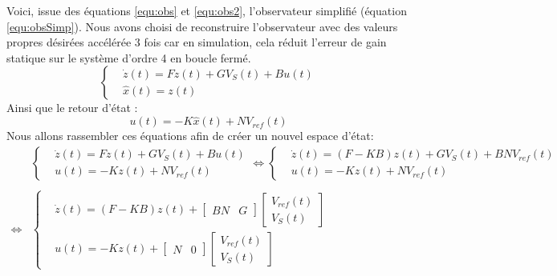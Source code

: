 Voici, issue des équations \ref{equ:obs} et \ref{equ:obs2}, l'observateur simplifié (équation \ref{equ:obsSimp}). Nous avons choisi de reconstruire l'observateur avec des valeurs propres désirées accélérée $3$ fois car en simulation, cela réduit l'erreur de gain statique sur le système d'ordre 4 en boucle fermé.
\begin{equation}
\label{equ:obsSimp}
\left\lbrace
\begin{aligned}
&\dot z (t) = Fz(t) + GV_S(t) + Bu(t)\\
&\hat{x}(t) = z(t)
\end{aligned}
\right.
\end{equation}
Ainsi que le retour d'état :
\begin{equation}
u(t) = -K\hat{x}(t) + N V_{ref}(t)
\end{equation}
Nous allons rassembler ces équations afin de créer un nouvel espace d'état:
\begin{equation}
\begin{array}{ll}
&\left\lbrace
\begin{aligned}
&\dot z (t) = Fz(t) + GV_S(t) + Bu(t)\\
&u(t) = -Kz(t) + N V_{ref}(t)
\end{aligned}
\right.
\Leftrightarrow
\left\lbrace
\begin{aligned}
&\dot z (t) = (F-KB)z(t) + GV_S(t) + BN V_{ref}(t)\\
&u(t) = -Kz(t) + N V_{ref}(t)
\end{aligned}
\right.\\
&\\

\Leftrightarrow&
\left\lbrace
\begin{aligned}
&\dot z (t) = (F-KB)z(t) + 
\begin{bmatrix} BN &  G  \end{bmatrix}  
\begin{bmatrix}  V_{ref}(t) \\ V_S(t) \end{bmatrix}  
\\
&u(t) = -Kz(t) + 
\begin{bmatrix} N &  0 \end{bmatrix}  
\begin{bmatrix} V_{ref}(t) \\ V_S(t) \end{bmatrix}  
\end{aligned}
\right.
\end{array}
\end{equation}
